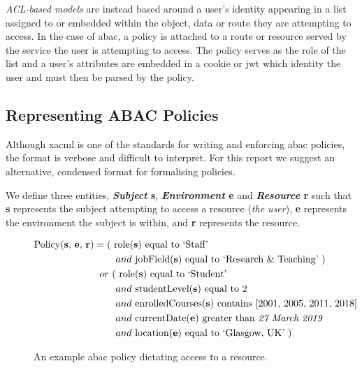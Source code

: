 \textit{ACL-based models} are instead based around a user's identity appearing in a list assigned to or embedded within the object, data or route they are attempting to access. In the case of \acrshort{abac}, a policy is attached to a route or resource served by the service the user is attempting to access. The policy serves as the role of the list and a user's attributes are embedded in a cookie or \acrshort{jwt} which identity the user and must then be parsed by the policy.

\subsection{Representing ABAC Policies}
\label{subsec:acc_ctrl_abac_policies}

Although \acrshort{xacml} is one of the standards for writing and enforcing \acrfull{abac} policies, the format is verbose and difficult to interpret. For this report we suggest an alternative, condensed format for formalising policies.

We define three entities, \textbf{\textit{Subject} s}, \textbf{\textit{Environment} e} and \textbf{\textit{Resource} r} such that \textbf{s} represents the subject attempting to access a resource (\textit{the user}), \textbf{e} represents the environment the subject is within, and \textbf{r} represents the resource.

\begin{figure}[ht]
  \centering
\begin{align*}
  \text{Policy(\textbf{s}, \textbf{e}, \textbf{r})}
  &
    =
    \text{( role(\textbf{s}) equal to `Staff'}
  \\
  &
    \phantom{::::::::} and
    \text{ jobField(\textbf{s}) equal to `Research \& Teaching' )}
  \\
  &
    \phantom{::} or
    \text{ ( role(\textbf{s}) equal to `Student'}
  \\
  &
    \phantom{::::::::} and
    \text{ studentLevel(\textbf{s}) equal to 2}
  \\
  &
    \phantom{::::::::} and
    \text{ enrolledCourses(\textbf{s}) contains [2001, 2005, 2011, 2018]}
  \\
  &
    \phantom{::::::::} and
    \text{ currentDate(\textbf{e}) greater than \textit{27 March 2019} }
  \\
  &
    \phantom{::::::::} and
    \text{ location(\textbf{e}) equal to `Glasgow, UK' )}
\end{align*}
  \caption{
    \label{fig:bkgr_abac_policy}
    An example \acrshort{abac} policy dictating access to a resource.
  }
\end{figure}

